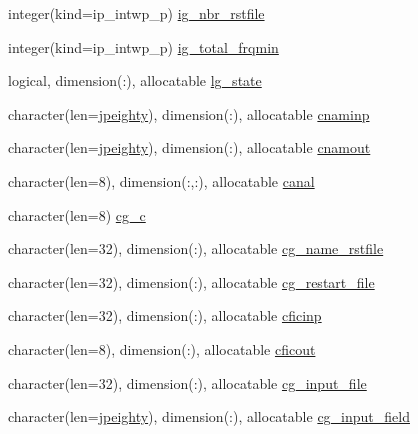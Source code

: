 \begin{DoxyCompactItemize}
\item 
integer(kind=ip\+\_\+intwp\+\_\+p) \hyperlink{namespacemod__oasis__namcouple_a05148b30ca97c536b40a896153c8921f}{ig\+\_\+nbr\+\_\+rstfile}
\item 
integer(kind=ip\+\_\+intwp\+\_\+p) \hyperlink{namespacemod__oasis__namcouple_a839912711f8d2f44a825689e2673d0dd}{ig\+\_\+total\+\_\+frqmin}
\item 
logical, dimension(\+:), allocatable \hyperlink{namespacemod__oasis__namcouple_ac1be1629c1369b96a4ff08c07200a05d}{lg\+\_\+state}
\item 
character(len=\hyperlink{namespacemod__oasis__namcouple_a4fb10ad6e864dcbe34c4a8b02204a523}{jpeighty}), dimension(\+:), allocatable \hyperlink{namespacemod__oasis__namcouple_a1f6ff08cee0c3c5deb262c1447d88328}{cnaminp}
\item 
character(len=\hyperlink{namespacemod__oasis__namcouple_a4fb10ad6e864dcbe34c4a8b02204a523}{jpeighty}), dimension(\+:), allocatable \hyperlink{namespacemod__oasis__namcouple_a71ba84b9a7a813ca2551bcde99a0b5b5}{cnamout}
\item 
character(len=8), dimension(\+:,\+:), allocatable \hyperlink{namespacemod__oasis__namcouple_a5eaa67fd4db1a3cde074adedd984ffbe}{canal}
\item 
character(len=8) \hyperlink{namespacemod__oasis__namcouple_a8a7387f27c409ea27aa53b616805f0fa}{cg\+\_\+c}
\item 
character(len=32), dimension(\+:), allocatable \hyperlink{namespacemod__oasis__namcouple_ac79429a9522aabddbe4ed68fd9571bec}{cg\+\_\+name\+\_\+rstfile}
\item 
character(len=32), dimension(\+:), allocatable \hyperlink{namespacemod__oasis__namcouple_a6eec7fe795bfb9c2058c7953c072d442}{cg\+\_\+restart\+\_\+file}
\item 
character(len=32), dimension(\+:), allocatable \hyperlink{namespacemod__oasis__namcouple_af17e746f51dcf0110428ebe55f6d7285}{cficinp}
\item 
character(len=8), dimension(\+:), allocatable \hyperlink{namespacemod__oasis__namcouple_a62f96a372f013fc37713f8ba1728e3de}{cficout}
\item 
character(len=32), dimension(\+:), allocatable \hyperlink{namespacemod__oasis__namcouple_a24f56cf88d79190f229d3fd1d62d17de}{cg\+\_\+input\+\_\+file}
\item 
character(len=\hyperlink{namespacemod__oasis__namcouple_a4fb10ad6e864dcbe34c4a8b02204a523}{jpeighty}), dimension(\+:), allocatable \hyperlink{namespacemod__oasis__namcouple_aad4d4857b4c424e1b0f0bcc0a01aa6e3}{cg\+\_\+input\+\_\+field}

\end{DoxyCompactItemize}
